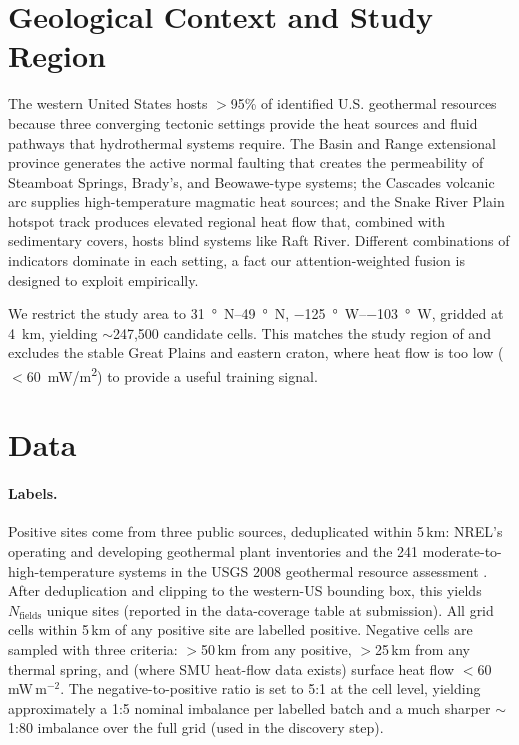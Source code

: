 \documentclass[review,12pt]{elsarticle}
\begin{document}
\section{Geological Context and Study Region}
\label{sec:context}

The western United States hosts $>$95\% of identified U.S. geothermal resources because three converging tectonic settings provide the heat sources and fluid pathways that hydrothermal systems require. The Basin and Range extensional province generates the active normal faulting that creates the permeability of Steamboat Springs, Brady's, and Beowawe-type systems; the Cascades volcanic arc supplies high-temperature magmatic heat sources; and the Snake River Plain hotspot track produces elevated regional heat flow that, combined with sedimentary covers, hosts blind systems like Raft River. Different combinations of indicators dominate in each setting, a fact our attention-weighted fusion is designed to exploit empirically.

We restrict the study area to \SIrange{31}{49}{\degree N}, \SIrange{-125}{-103}{\degree W}, gridded at \SI{4}{\kilo\meter}, yielding $\sim$247{,}500 candidate cells. This matches the study region of \citet{Faulds2020,Mordensky2025} and excludes the stable Great Plains and eastern craton, where heat flow is too low ($<$\SI{60}{mW/m^2}) to provide a useful training signal.

\section{Data}
\label{sec:data}

\paragraph{Labels.} Positive sites come from three public sources, deduplicated within 5\,km: NREL's operating and developing geothermal plant inventories and the 241 moderate-to-high-temperature systems in the USGS 2008 geothermal resource assessment \citep{Williams2008}. After deduplication and clipping to the western-US bounding box, this yields $N_\text{fields}$ unique sites (reported in the data-coverage table at submission). All grid cells within 5\,km of any positive site are labelled positive. Negative cells are sampled with three criteria: $>$50\,km from any positive, $>$25\,km from any thermal spring, and (where SMU heat-flow data exists) surface heat flow $<$60\,mW\,m$^{-2}$. The negative-to-positive ratio is set to 5:1 at the cell level, yielding approximately a 1:5 nominal imbalance per labelled batch and a much sharper $\sim$1:80 imbalance over the full grid (used in the discovery step).
\end{document}
